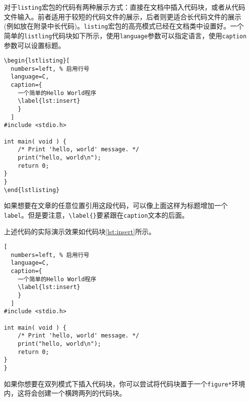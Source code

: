 对于\texttt{listing}宏包的代码有两种展示方式：直接在文档中插入代码块，或者从代码文件输入。前者适用于较短的代码文件的展示，后者则更适合长代码文件的展示 (例如放在附录中长代码)。\texttt{listing}宏包的高亮模式已经在文档类中设置好。一个简单的\texttt{listling}代码块如下所示，使用\texttt{language}参数可以指定语言，使用\texttt{caption}参数可以设置标题。

\begin{verbatim}
\begin{lstlisting}[
  numbers=left, % 启用行号
  language=C, 
  caption={
    一个简单的Hello World程序
    \label{lst:insert}
    }
  ]
#include <stdio.h>

int main( void ) {
    /* Print 'hello, world' message. */
    print("hello, world\n");
    return 0;
}
}
\end{lstlisting}
\end{verbatim}

\begin{note}
  如果想要在文章的任意位置引用这段代码，可以像上面这样为标题增加一个\texttt{label}。但是要注意，\texttt{\textbackslash label\{\}}要紧跟在\texttt{caption}文本的后面。
\end{note}

上述代码的实际演示效果如代码块\ref{lst:insert}所示。

\begin{lstlisting}[
  numbers=left, % 启用行号
  language=C, 
  caption={
    一个简单的Hello World程序
    \label{lst:insert}
    }
  ]
#include <stdio.h>

int main( void ) {
    /* Print 'hello, world' message. */
    print("hello, world\n");
    return 0;
}
}
\end{lstlisting}

\begin{note}
  如果你想要在双列模式下插入代码块，你可以尝试将代码块置于一个\texttt{figure*}环境内，这将会创建一个横跨两列的代码块。
\end{note}

